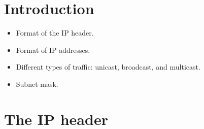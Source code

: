\section{Introduction}
\begin{itemize}
    \item Format of the IP header.
    \item Format of IP addresses.
    \item Different types of traffic: unicast, broadcast, and multicast.
    \item Subnet mask.
\end{itemize}


\section{The IP header}
